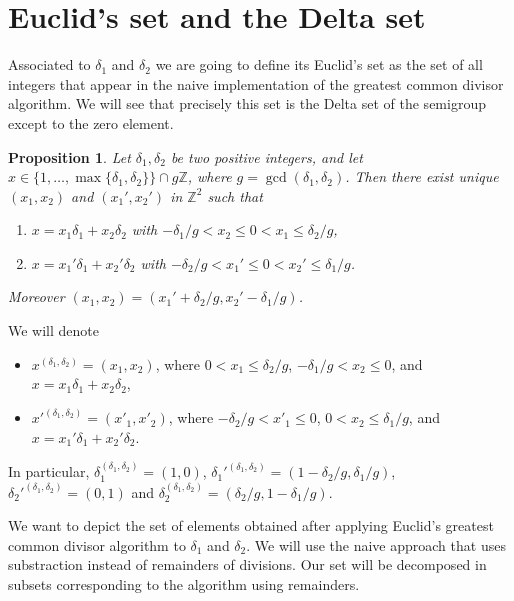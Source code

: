 \documentclass[11pt]{amsart}
\newtheorem{proposition}[theorem]{Proposition}
\theoremstyle{remark}
\begin{document}
\section{Euclid's set and the Delta set}

Associated to $\delta_1$ and $\delta_2$ we are going to define its Euclid's set as the set of all integers that appear in the naive implementation of the greatest common divisor algorithm. We will see that precisely this set is the Delta set of the semigroup except to the zero element. 

\begin{proposition}\label{unique}
Let $\delta_1,\delta_2$ be two positive integers, and let $x\in \{1,\ldots, \max\{\delta_1,\delta_2\}\}\cap g\mathbb Z$, where $g=\gcd(\delta_1,\delta_2)$. Then there exist unique $(x_1,x_2)$ and $(x_1',x_2')$ in $\mathbb Z^2$ such that 
\begin{enumerate}
\item $x=x_1 \delta_1+x_2\delta_2$ with $-\delta_1/g<x_2 \le 0< x_1 \le \delta_2/g$,
\item $x=x_1'\delta_1+x_2'\delta_2$ with $-\delta_2/g<x_1' \le 0< x_2' \le \delta_1/g$.
\end{enumerate}
Moreover $(x_1,x_2)=(x_1'+\delta_2/g,x_2'-\delta_1/g)$.
\end{proposition}

We will denote 
\begin{itemize}
    \item $x^{(\delta_1,\delta_2)}=(x_1,x_2)$, where $0<x_1 \le \delta_2/g$, $-\delta_1/g<x_2\le 0$, and $x=x_1\delta_1+x_2\delta_2$, 
    \item $x'^{(\delta_1,\delta_2)}=(x'_1,x'_2)$,  where $-\delta_2/g<x'_1 \le 0$, $0<x_2\le \delta_1/g$, and $x=x_1'\delta_1+x_2'\delta_2$.   
\end{itemize}
In particular, $\delta_1^{(\delta_1,\delta_2)}=(1,0)$, $\delta_1'^{(\delta_1,\delta_2)}= (1-\delta_2/g,\delta_1/g)$, $\delta_2'^{(\delta_1,\delta_2)}=(0,1)$  and $\delta_2^{(\delta_1,\delta_2)}=(\delta_2/g,1-\delta_1/g)$.

We want to depict the set of elements obtained after applying Euclid's greatest common divisor algorithm to $\delta_1$ and $\delta_2$. We will use the naive approach that uses substraction instead of remainders of divisions. Our set will be decomposed in subsets corresponding to the algorithm using remainders. %
\end{document}
